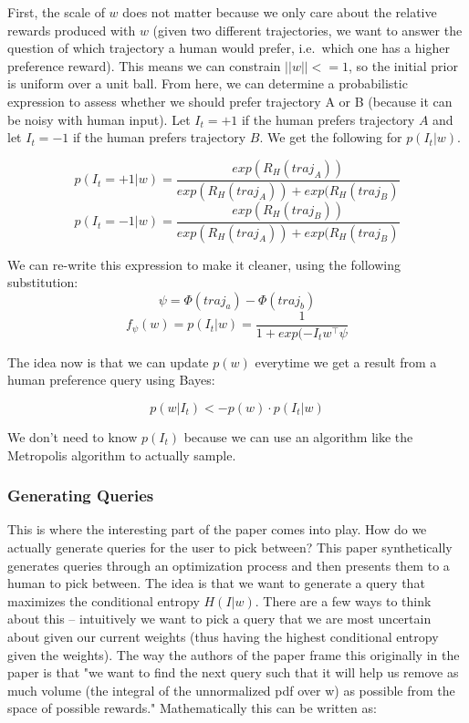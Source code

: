\documentclass[
  letterpaper,
  DIV=11,
  numbers=noendperiod,
  oneside]{scrreprt}
\theoremstyle{remark}
\begin{document}
First, the scale of \(w\) does not matter because we only care about the
relative rewards produced with \(w\) (given two different trajectories,
we want to answer the question of which trajectory a human would prefer,
i.e.~which one has a higher preference reward). This means we can
constrain \(||w|| <= 1\), so the initial prior is uniform over a unit
ball. From here, we can determine a probabilistic expression to assess
whether we should prefer trajectory A or B (because it can be noisy with
human input). Let \(I_t = +1\) if the human prefers trajectory \(A\) and
let \(I_t = -1\) if the human prefers trajectory \(B\). We get the
following for \(p(I_t | w)\).

\[p(I_t = +1|w) = \frac{exp(R_H(traj_A))}{exp(R_H(traj_A)) + exp(R_H(traj_B)}\]
\[p(I_t = -1|w) = \frac{exp(R_H(traj_B))}{exp(R_H(traj_A)) + exp(R_H(traj_B)}\]

We can re-write this expression to make it cleaner, using the following
substitution: \[\psi = \Phi(traj_a) - \Phi(traj_b)\]
\[f_{\psi} (w) = p(I_t|w) = \frac{1}{1 + exp(-I_tw^{\intercal}\psi}\]

The idea now is that we can update \(p(w)\) everytime we get a result
from a human preference query using Bayes:

\[p(w|I_t) <- p(w) \cdot p(I_t|w)\]

We don't need to know \(p(I_t)\) because we can use an algorithm like
the Metropolis algorithm to actually sample.

\subsubsection{Generating Queries}\label{generating-queries}

This is where the interesting part of the paper comes into play. How do
we actually generate queries for the user to pick between? This paper
synthetically generates queries through an optimization process and then
presents them to a human to pick between. The idea is that we want to
generate a query that maximizes the conditional entropy \(H(I|w)\).
There are a few ways to think about this -- intuitively we want to pick
a query that we are most uncertain about given our current weights (thus
having the highest conditional entropy given the weights). The way the
authors of the paper frame this originally in the paper is that "we want
to find the next query such that it will help us remove as much volume
(the integral of the unnormalized pdf over w) as possible from the space
of possible rewards." Mathematically this can be written as:
\end{document}
